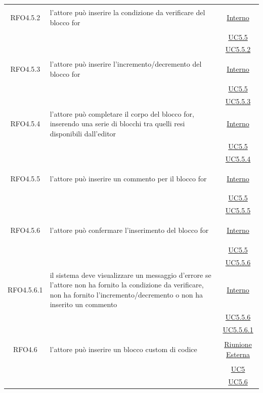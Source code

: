 \begin{longtable}{|c|>{\centering}m{7cm}|c|}
\hypertarget{RFO4.5.2}{RFO4.5.2} & l'attore può inserire la condizione da verificare del blocco for & \hyperlink{Interno}{Interno}\\
& &\hyperref[UC5.5]{UC5.5}\\
& &\hyperref[UC5.5.2]{UC5.5.2}\\ \hline

\hypertarget{RFO4.5.3}{RFO4.5.3} & l'attore può inserire l'incremento/decremento del blocco for & \hyperlink{Interno}{Interno}\\
& &\hyperref[UC5.5]{UC5.5}\\
& &\hyperref[UC5.5.3]{UC5.5.3}\\ \hline

\hypertarget{RFO4.5.4}{RFO4.5.4} & l'attore può completare il corpo del blocco for, inserendo una serie di blocchi tra quelli resi disponibili dall'editor  &\hyperlink{Interno}{Interno}\\
& &\hyperref[UC5.5]{UC5.5}\\
& &\hyperref[UC5.5.4]{UC5.5.4}\\ \hline

\hypertarget{RFO4.5.5}{RFO4.5.5} & l'attore può inserire un commento per il blocco for & \hyperlink{Interno}{Interno}\\
& &\hyperref[UC5.5]{UC5.5}\\
& &\hyperref[UC5.5.5]{UC5.5.5}\\ \hline

\hypertarget{RFO4.5.6}{RFO4.5.6} & l'attore può confermare l'inserimento del blocco for &  \hyperlink{Interno}{Interno}\\
& &\hyperref[UC5.5]{UC5.5}\\
& &\hyperref[UC5.5.6]{UC5.5.6}\\ \hline

\hypertarget{RFO4.5.6.1}{RFO4.5.6.1} & il sistema deve visualizzare un messaggio d'errore se l'attore non ha fornito la condizione da verificare, non ha fornito l'incremento/decremento o non ha inserito un commento & \hyperlink{Interno}{Interno}\\
& &\hyperref[UC5.5.6]{UC5.5.6}\\
& &\hyperref[UC5.5.6.1]{UC5.5.6.1}\\ \hline

\hypertarget{RFO4.6}{RFO4.6} & l'attore può inserire un blocco custom di codice & \hyperlink{Riunione Esterna}{Riunione Esterna}\\
& &\hyperref[UC5]{UC5}\\
& &\hyperref[UC5.6]{UC5.6}\\ \hline


\end{longtable}
